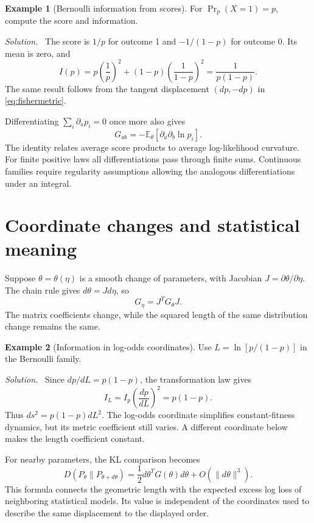 \documentclass[11pt,oneside,openany]{book}
\theoremstyle{definition}
\newtheorem{example}{Example}[chapter]
\theoremstyle{remark}
\newenvironment{solution}{\par\smallskip\noindent\textit{Solution.}\ }{\par\smallskip}
\newcommand{\E}{\mathbb{E}}
\numberwithin{equation}{chapter}
\begin{document}
\begin{example}[Bernoulli information from scores]
For $\Pr_p(X=1)=p$, compute the score and information.
\begin{solution}
The score is $1/p$ for outcome 1 and $-1/(1-p)$ for outcome 0. Its mean is zero, and
\[
I(p)=p\left(\frac1p\right)^2+(1-p)\left(\frac1{1-p}\right)^2
=\frac1{p(1-p)}.
\]
The same result follows from the tangent displacement $(dp,-dp)$ in \eqref{eq:fishermetric}.
\end{solution}
\end{example}

Differentiating $\sum_i\partial_ap_i=0$ once more also gives
\[
G_{ab}=-\E_\theta[\partial_a\partial_b\ln p_i].
\]
The identity relates average score products to average log-likelihood curvature. For finite positive laws all differentiations pass through finite sums. Continuous families require regularity assumptions allowing the analogous differentiations under an integral.

\section{Coordinate changes and statistical meaning}
Suppose $\theta=\theta(\eta)$ is a smooth change of parameters, with Jacobian $J=\partial\theta/\partial\eta$. The chain rule gives $d\theta=Jd\eta$, so
\begin{equation}\label{eq:metrictransform}
G_\eta=J^TG_\theta J.
\end{equation}
The matrix coefficients change, while the squared length of the same distribution change remains the same.

\begin{example}[Information in log-odds coordinates]
Use $L=\ln[p/(1-p)]$ in the Bernoulli family.
\begin{solution}
Since $dp/dL=p(1-p)$, the transformation law gives
\[
I_L=I_p\left(\frac{dp}{dL}\right)^2=p(1-p).
\]
Thus $ds^2=p(1-p)dL^2$. The log-odds coordinate simplifies constant-fitness dynamics, but its metric coefficient still varies. A different coordinate below makes the length coefficient constant.
\end{solution}
\end{example}

For nearby parameters, the KL comparison becomes
\[
D(P_\theta\|P_{\theta+d\theta})
=\frac12d\theta^TG(\theta)d\theta+O(\|d\theta\|^3).
\]
This formula connects the geometric length with the expected excess log loss of neighboring statistical models. Its value is independent of the coordinates used to describe the same displacement to the displayed order.
\end{document}
